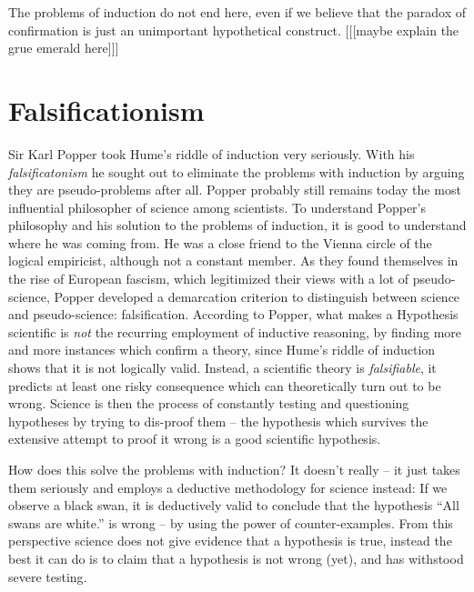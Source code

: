 The problems of induction do not end here, even if we believe that
the paradox of confirmation is just an unimportant hypothetical
construct.
    [[[maybe explain the grue emerald here]]]

\section{Falsificationism}
Sir Karl Popper took Hume's riddle of induction very seriously.
With his \emph{falsificatonism} he sought out to eliminate the
problems with induction by arguing they are pseudo-problems after all.
Popper probably still remains today the most influential philosopher of science
among scientists.
To understand Popper's philosophy and his solution to the problems of induction,
it is good to understand where he was coming from.
He was a close friend to the Vienna circle of the logical empiricist,
although not a constant member.
As they found themselves in the rise of European fascism, which
legitimized their views with a lot of pseudo-science,
Popper developed a demarcation criterion to distinguish
between science and pseudo-science: falsification.
According to Popper, what makes a Hypothesis scientific is \emph{not}
the recurring employment of inductive reasoning, by
finding more and more instances which confirm a theory,
since Hume's riddle of induction shows that it
is not logically valid.
Instead, a scientific theory is \emph{falsifiable},
it predicts at least one risky consequence which
can theoretically turn out to be wrong.
Science is then the process of constantly testing and
questioning hypotheses by trying to dis-proof them
-- the hypothesis which survives the extensive
attempt to proof it wrong is a good scientific hypothesis.

How does this solve the problems with induction?
It doesn't really -- it just takes them seriously and
employs a deductive methodology for science instead:
If we observe a black swan, it is deductively valid to conclude
that the hypothesis \enquote{All swans are white.} is wrong --
by using the power of counter-examples.
From this perspective science does not
give evidence that a hypothesis is true,
instead the best it can do is to claim that a hypothesis is not
wrong (yet), and has withstood severe testing.
